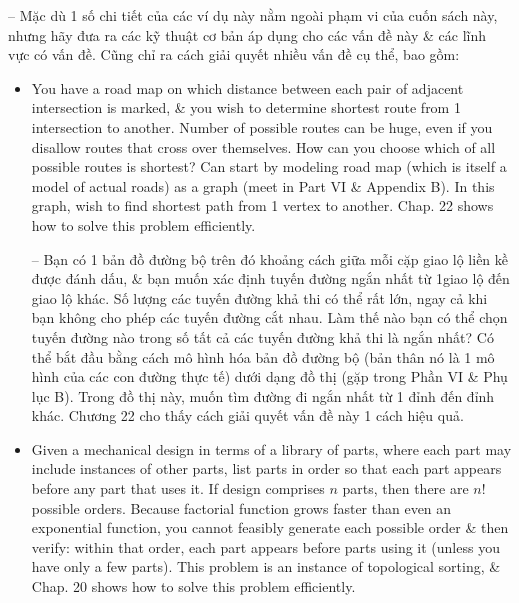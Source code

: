 \documentclass{article}
\begin{document}
\begin{itemize}
\begin{itemize}
\begin{itemize}
            -- Mặc dù 1 số chi tiết của các ví dụ này nằm ngoài phạm vi của cuốn sách này, nhưng hãy đưa ra các kỹ thuật cơ bản áp dụng cho các vấn đề này \& các lĩnh vực có vấn đề. Cũng chỉ ra cách giải quyết nhiều vấn đề cụ thể, bao gồm:
            \begin{itemize}
                \item You have a road map on which distance between each pair of adjacent intersection is marked, \& you wish to determine shortest route from 1 intersection to another. Number of possible routes can be huge, even if you disallow routes that cross over themselves. How can you choose which of all possible routes is shortest? Can start by modeling road map (which is itself a model of actual roads) as a graph (meet in Part VI \& Appendix B). In this graph, wish to find shortest path from 1 vertex to another. Chap. 22 shows how to solve this problem efficiently.
                
                -- Bạn có 1 bản đồ đường bộ trên đó khoảng cách giữa mỗi cặp giao lộ liền kề được đánh dấu, \& bạn muốn xác định tuyến đường ngắn nhất từ 1giao lộ đến giao lộ khác. Số lượng các tuyến đường khả thi có thể rất lớn, ngay cả khi bạn không cho phép các tuyến đường cắt nhau. Làm thế nào bạn có thể chọn tuyến đường nào trong số tất cả các tuyến đường khả thi là ngắn nhất? Có thể bắt đầu bằng cách mô hình hóa bản đồ đường bộ (bản thân nó là 1 mô hình của các con đường thực tế) dưới dạng đồ thị (gặp trong Phần VI \& Phụ lục B). Trong đồ thị này, muốn tìm đường đi ngắn nhất từ 1 đỉnh đến đỉnh khác. Chương 22 cho thấy cách giải quyết vấn đề này 1 cách hiệu quả.
                \item Given a mechanical design in terms of a library of parts, where each part may include instances of other parts, list parts in order so that each part appears before any part that uses it. If design comprises $n$ parts, then there are $n!$ possible orders. Because factorial function grows faster than even an exponential function, you cannot feasibly generate each possible order \& then verify: within that order, each part appears before parts using it (unless you have only a few parts). This problem is an instance of topological sorting, \& Chap. 20 shows how to solve this problem efficiently.
                

\end{itemize}
\end{itemize}
\end{itemize}
\end{itemize}
\end{document}
